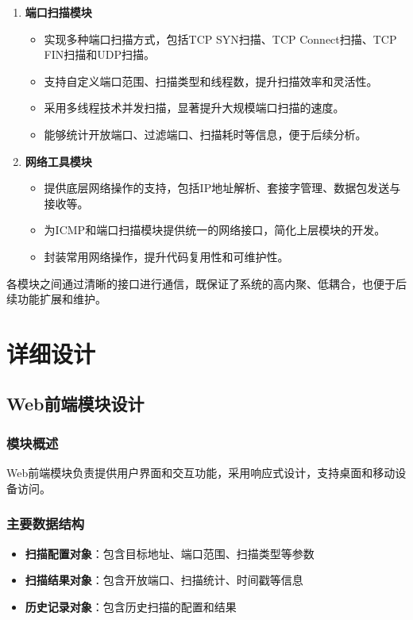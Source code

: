\documentclass[12pt,hyperref,a4paper,UTF8]{ctexart}
\begin{document}
\begin{enumerate}
    \item \textbf{端口扫描模块}
    \begin{itemize}
        \item 实现多种端口扫描方式，包括TCP SYN扫描、TCP Connect扫描、TCP FIN扫描和UDP扫描。
        \item 支持自定义端口范围、扫描类型和线程数，提升扫描效率和灵活性。
        \item 采用多线程技术并发扫描，显著提升大规模端口扫描的速度。
        \item 能够统计开放端口、过滤端口、扫描耗时等信息，便于后续分析。
    \end{itemize}

    \item \textbf{网络工具模块}
    \begin{itemize}
        \item 提供底层网络操作的支持，包括IP地址解析、套接字管理、数据包发送与接收等。
        \item 为ICMP和端口扫描模块提供统一的网络接口，简化上层模块的开发。
        \item 封装常用网络操作，提升代码复用性和可维护性。
    \end{itemize}
\end{enumerate}

各模块之间通过清晰的接口进行通信，既保证了系统的高内聚、低耦合，也便于后续功能扩展和维护。

\section{详细设计}

\subsection{Web前端模块设计}

\subsubsection{模块概述}
Web前端模块负责提供用户界面和交互功能，采用响应式设计，支持桌面和移动设备访问。

\subsubsection{主要数据结构}
\begin{itemize}
    \item \textbf{扫描配置对象}：包含目标地址、端口范围、扫描类型等参数
    \item \textbf{扫描结果对象}：包含开放端口、扫描统计、时间戳等信息
    \item \textbf{历史记录对象}：包含历史扫描的配置和结果
\end{itemize}
\end{document}

